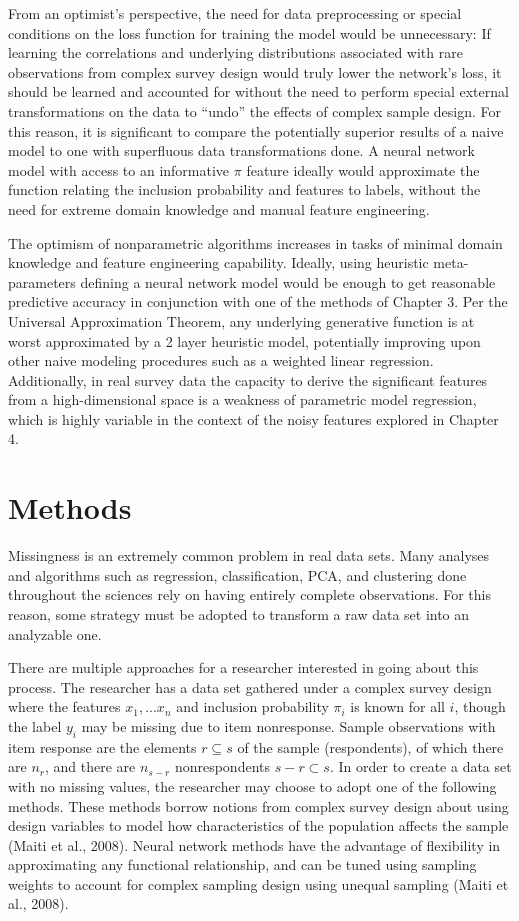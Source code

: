 \documentclass[12pt,twoside]{reedthesis}
\begin{document}
From an optimist's perspective, the need for data preprocessing or
special conditions on the loss function for training the model would be
unnecessary: If learning the correlations and underlying distributions
associated with rare observations from complex survey design would truly
lower the network's loss, it should be learned and accounted for without
the need to perform special external transformations on the data to
``undo'' the effects of complex sample design. For this reason, it is
significant to compare the potentially superior results of a naive model
to one with superfluous data transformations done. A neural network
model with access to an informative \(\pi\) feature ideally would
approximate the function relating the inclusion probability and features
to labels, without the need for extreme domain knowledge and manual
feature engineering.

The optimism of nonparametric algorithms increases in tasks of minimal
domain knowledge and feature engineering capability. Ideally, using
heuristic meta-parameters defining a neural network model would be
enough to get reasonable predictive accuracy in conjunction with one of
the methods of Chapter 3. Per the Universal Approximation Theorem, any
underlying generative function is at worst approximated by a 2 layer
heuristic model, potentially improving upon other naive modeling
procedures such as a weighted linear regression. Additionally, in real
survey data the capacity to derive the significant features from a
high-dimensional space is a weakness of parametric model regression,
which is highly variable in the context of the noisy features explored
in Chapter 4.

\chapter{Methods}\label{methods}

Missingness is an extremely common problem in real data sets. Many
analyses and algorithms such as regression, classification, PCA, and
clustering done throughout the sciences rely on having entirely complete
observations. For this reason, some strategy must be adopted to
transform a raw data set into an analyzable one.

There are multiple approaches for a researcher interested in going about
this process. The researcher has a data set gathered under a complex
survey design where the features \(x_1,...x_n\) and inclusion
probability \(\pi_i\) is known for all \(i\), though the label \(y_i\)
may be missing due to item nonresponse. Sample observations with item
response are the elements \(r \subseteq s\) of the sample (respondents),
of which there are \(n_r\), and there are \(n_{s-r}\) nonrespondents
\(s-r \subset s\). In order to create a data set with no missing values,
the researcher may choose to adopt one of the following methods. These
methods borrow notions from complex survey design about using design
variables to model how characteristics of the population affects the
sample (Maiti et al., 2008). Neural network methods have the advantage
of flexibility in approximating any functional relationship, and can be
tuned using sampling weights to account for complex sampling design
using unequal sampling (Maiti et al., 2008).
\end{document}
